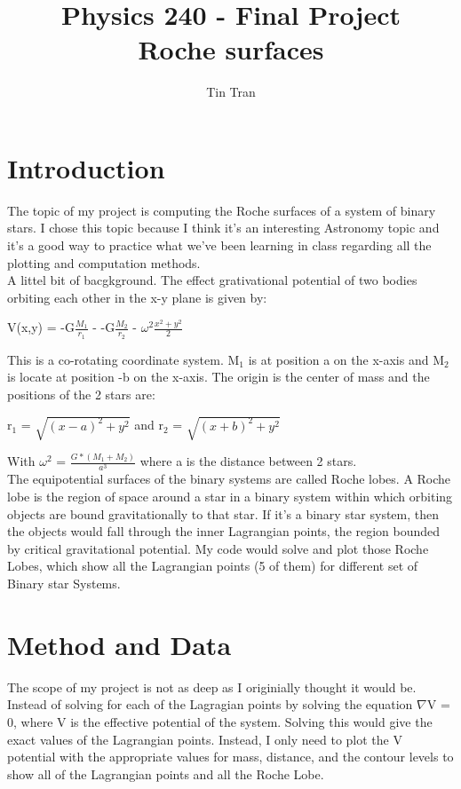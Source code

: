 \documentclass{article}
\begin{document}
\title{Physics 240 - Final Project\\
		Roche surfaces}
\author{Tin Tran}

\maketitle

\section{Introduction}
The topic of my project is computing the Roche surfaces of a system of binary stars. I chose this topic because I think it's an interesting Astronomy topic and it's a good way to practice what we've been learning in class regarding all the plotting and computation methods.\\
A littel bit of bacgkground. The effect grativational potential of two bodies orbiting each other in the x-y plane is given by:
\begin{center}
V(x,y) = -G$\frac{M_1}{r_1}$ - -G$\frac{M_2}{r_2}$ - $\omega^2\frac{x^2+y^2}{2}$
\end{center}
This is a co-rotating coordinate system. M$_1$ is at position a on the x-axis and M$_2$ is locate at position -b on the x-axis. The origin is the center of mass and the positions of the 2 stars are:
\begin{center}
r$_1$ = $\sqrt{(x-a)^2+y^2}$ and r$_2$ = $\sqrt{(x+b)^2+y^2}$\\
\end{center}
With $\omega^2$ = $\frac{G*(M_1+M_2)}{a^3}$ where a is the distance between 2 stars.\\
The equipotential surfaces of the binary systems are called Roche lobes. A Roche lobe is the region of space around a star in a binary system within which orbiting objects are bound gravitationally to that star. If it's a binary star system, then the objects would fall through the inner Lagrangian points, the region bounded by critical gravitational potential.  My code would solve and plot those Roche Lobes, which show all the Lagrangian points (5 of them) for different set of Binary star Systems. 

\section{Method and Data}
The scope of my project is not as deep as I originially thought it would be. Instead of solving for each of the Lagragian points by solving the equation $\nabla$V = 0, where V is the effective potential of the system. Solving this would give the exact values of the Lagrangian points. Instead, I only need to plot the V potential with the appropriate values for mass, distance, and the contour levels to show all of the Lagrangian points and all the Roche Lobe.
\end{document}
